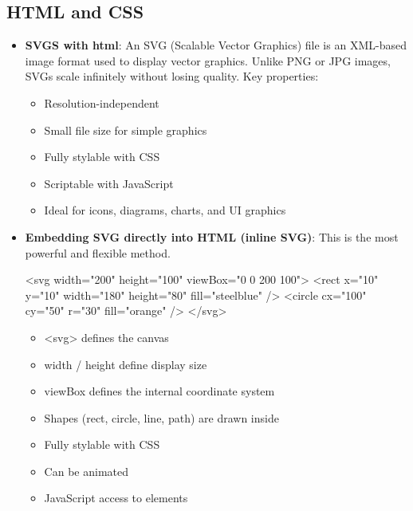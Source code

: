 \documentclass{report}
\begin{document}
    \subsection{HTML and CSS}
    \begin{itemize}
        \item \textbf{SVGS with html}: An SVG (Scalable Vector Graphics) file is an XML-based image format used to display vector graphics. Unlike PNG or JPG images, SVGs scale infinitely without losing quality.        
            \bigbreak \noindent 
            Key properties:
            \begin{itemize}
                \item Resolution-independent
                \item Small file size for simple graphics
                \item Fully stylable with CSS
                \item Scriptable with JavaScript
                \item Ideal for icons, diagrams, charts, and UI graphics
            \end{itemize}
        \item \textbf{Embedding SVG directly into HTML (inline SVG)}: This is the most powerful and flexible method.
            \bigbreak \noindent 
            \begin{htmlcode}
                <svg width="200" height="100" viewBox="0 0 200 100">
                    <rect x="10" y="10" width="180" height="80" fill="steelblue" />
                    <circle cx="100" cy="50" r="30" fill="orange" />
                </svg>
            \end{htmlcode}
            \bigbreak \noindent 
            \begin{itemize}
                \item <svg> defines the canvas
                \item width / height define display size
                \item viewBox defines the internal coordinate system
                \item Shapes (rect, circle, line, path) are drawn inside
            \end{itemize}
            \begin{itemize}
                \item Fully stylable with CSS
                \item Can be animated
                \item JavaScript access to elements

\end{itemize}
\end{itemize}
\end{document}
